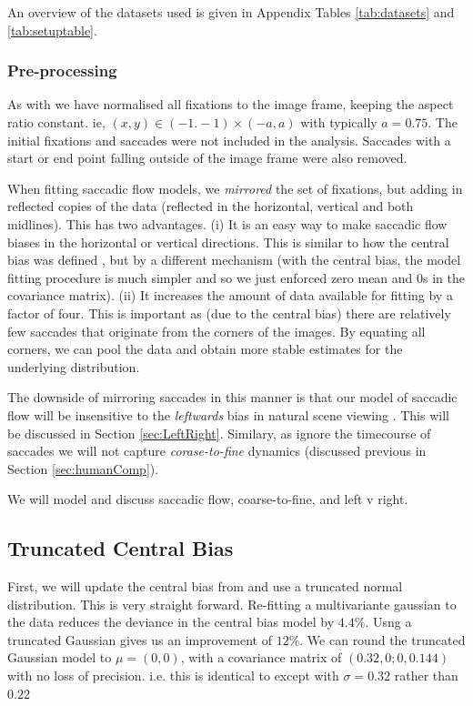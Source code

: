 An overview of the datasets used is given in Appendix Tables \ref{tab:datasets} and \ref{tab:setuptable}.

\subsubsection{Pre-processing}

As with \cite{clarke-tatler2014} we have normalised all fixations to the image frame, keeping the aspect ratio constant. ie, $(x,y)\in (-1.-1)\times(-a,a)$ with typically $a=0.75$. The initial fixations and saccades were not included in the analysis. Saccades with a start or end point falling outside of the image frame were also removed. 

When fitting saccadic flow models,  we \textit{mirrored} the set of fixations, but adding in reflected copies of the data (reflected in the horizontal, vertical and both midlines). This has two advantages. (i) It is an easy way to make saccadic flow biases in the horizontal or vertical directions. This is similar to how the central bias was defined \cite{clarke-tatler2014}, but by a different mechanism (with the central bias, the model fitting procedure is much simpler and so we just enforced zero mean and 0s in the covariance matrix). (ii) It increases the amount of data available for fitting by a factor of four. This is important as (due to the central bias) there are relatively few saccades that originate from the corners of the images. By equating all corners, we can pool the data and obtain more stable estimates for the underlying distribution. 


The downside of mirroring saccades in this manner is that our model of saccadic flow will be insensitive to the \textit{leftwards} bias in natural scene viewing \citep{nuthmann-matthias2014}. This will be discussed in Section \ref{sec:LeftRight}. Similary, as ignore the timecourse of saccades we will not capture \textit{corase-to-fine} dynamics (discussed previous in Section \ref{sec:humanComp}).

We will model and discuss saccadic flow, coarse-to-fine, and left v right. 

\subsection{Truncated Central Bias}
\label{sec:truncatedCentral}
First, we will update the central bias from \cite{clarke-tatler2014} and use a truncated normal distribution. This is very straight forward. Re-fitting a multivariante gaussian to the data reduces the deviance in the central bias model by $4.4\%$. Usng a truncated Gaussian gives us an improvement of $12\%$. We can round the truncated Gaussian model to $\mu = (0,0)$, with a covariance matrix of $(0.32, 0; 0, 0.144)$ with no loss of precision. i.e. this is identical to \cite{clarke-tatler2014} except with $\sigma=0.32$ rather than $0.22$

